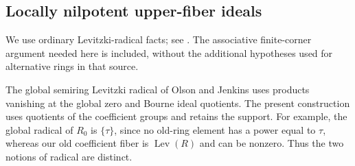 \subsection{Locally nilpotent upper-fiber ideals}
We use ordinary Levitzki-radical facts; see
\cite[p.~53 and Corollary~1, p.~57]{Rich}. The associative finite-corner
argument needed here is included, without the additional hypotheses
used for alternative rings in that source.

The global semiring Levitzki radical of Olson and Jenkins
\cite[Definitions~1--2, p.~91]{OlsonJenkins} uses products vanishing at
the global zero and Bourne ideal quotients. The present construction
uses quotients of the coefficient groups and retains the support.
For example, the global radical of $R_0$ is $\{\tau\}$, since no
old-ring element has a power equal to $\tau$, whereas our old
coefficient fiber is $\operatorname{Lev}(R)$ and can be nonzero.
Thus the two notions of radical are distinct.

